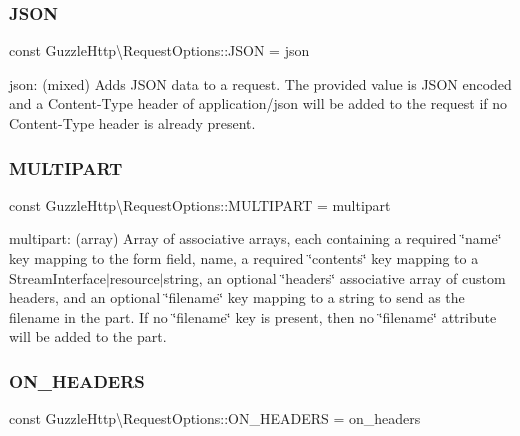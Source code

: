 \subsubsection{\texorpdfstring{J\+S\+ON}{JSON}}
{\footnotesize\ttfamily const Guzzle\+Http\textbackslash{}\+Request\+Options\+::\+J\+S\+ON = \textquotesingle{}json\textquotesingle{}}

json\+: (mixed) Adds J\+S\+ON data to a request. The provided value is J\+S\+ON encoded and a Content-\/\+Type header of application/json will be added to the request if no Content-\/\+Type header is already present. \mbox{\label{classGuzzleHttp_1_1RequestOptions_a3e538b73894d7e42c7c73e65aa4a5b75}} 
\subsubsection{\texorpdfstring{M\+U\+L\+T\+I\+P\+A\+RT}{MULTIPART}}
{\footnotesize\ttfamily const Guzzle\+Http\textbackslash{}\+Request\+Options\+::\+M\+U\+L\+T\+I\+P\+A\+RT = \textquotesingle{}multipart\textquotesingle{}}

multipart\+: (array) Array of associative arrays, each containing a required \char`\"{}name\char`\"{} key mapping to the form field, name, a required \char`\"{}contents\char`\"{} key mapping to a Stream\+Interface$\vert$resource$\vert$string, an optional \char`\"{}headers\char`\"{} associative array of custom headers, and an optional \char`\"{}filename\char`\"{} key mapping to a string to send as the filename in the part. If no \char`\"{}filename\char`\"{} key is present, then no \char`\"{}filename\char`\"{} attribute will be added to the part. \mbox{\label{classGuzzleHttp_1_1RequestOptions_a85b62a6996bfbe075bec831640cf7849}} 
\subsubsection{\texorpdfstring{O\+N\+\_\+\+H\+E\+A\+D\+E\+RS}{ON\_HEADERS}}
{\footnotesize\ttfamily const Guzzle\+Http\textbackslash{}\+Request\+Options\+::\+O\+N\+\_\+\+H\+E\+A\+D\+E\+RS = \textquotesingle{}on\+\_\+headers\textquotesingle{}}

